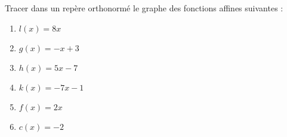 
\begin{exercice}\label{exosmath-0513}

    Tracer dans un repère orthonormé le graphe des fonctions affines suivantes :
    \begin{multicols}{2}
        \begin{enumerate}
            \item
                \( l(x)=8x\)
            \item
                \( g(x)=-x+3\)
            \item
                \( h(x)=5x-7\)
            \item
                \( k(x)=-7x-1\)
            \item
                \( f(x)=2x\)
            \item
                \( c(x)=-2\)
        \end{enumerate}
    \end{multicols}

\end{exercice}
